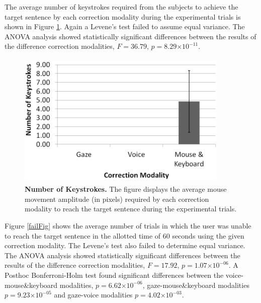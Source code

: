 \documentclass[]{article}
\providecommand{\e}[1]{\ensuremath{\times 10^{#1}}}
\begin{document}
The average number of keystrokes required from the subjects to achieve the target sentence by each correction modality
during the experimental trials is shown in Figure \ref{keystrokes}. Again a Levene's test failed to assume equal
variance. The ANOVA analysis showed statistically significant differences between the results of the
difference correction modalities, $F=36.79$, $p=8.29\e{-11}$. 

\begin{figure}[ht]
\begin{center}
\vspace{-3mm}
\includegraphics[width=0.9\textwidth,height=65mm]{figures/keystrokes.png}
\end{center}
\caption{\textbf{Number of Keystrokes.} The figure displays the average mouse movement amplitude (in pixels)
required by each correction modality to reach the target sentence during the experimental trials.}
\label{keystrokes}
\end{figure}


Figure \ref{failFig} shows the average number of trials in which the user was unable to reach the target sentence in the
allotted time of 60 seconds using the given correction modality. The Levene's test also failed to determine equal
variance. The ANOVA analysis showed statistically significant differences between the results of the
difference correction modalities, $F=17.92$, $p=1.07\e{-06}$.   A Posthoc Bonferroni-Holm test found
significant differences between the voice-mouse\&keyboard modalities, $p=6.62\e{-06}$, gaze-mouse\&keyboard modalities
$p=9.23\e{-05}$ and gaze-voice modalities $p=4.02\e{-03}$.
\end{document}

